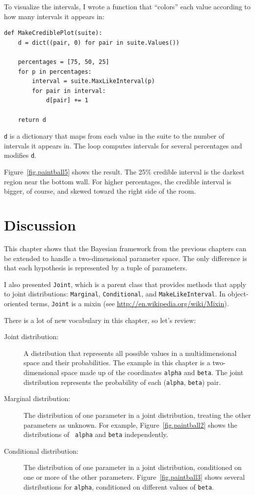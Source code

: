 \documentclass[12pt]{book}
\begin{document}
To visualize the intervals, I wrote a function that ``colors''
each value according to how many intervals it appears in:

\begin{verbatim}
def MakeCrediblePlot(suite):
    d = dict((pair, 0) for pair in suite.Values())

    percentages = [75, 50, 25]
    for p in percentages:
        interval = suite.MaxLikeInterval(p)
        for pair in interval:
            d[pair] += 1

    return d
\end{verbatim}

{\tt d} is a dictionary that maps from each value in the suite
to the number of intervals it appears in.  The loop computes intervals
for several percentages and modifies {\tt d}.

Figure~\ref{fig.paintball5} shows the result.  The 25\% credible
interval is the darkest region near the bottom wall.  For higher
percentages, the credible interval is bigger, of course, and skewed
toward the right side of the room.


\section{Discussion}

This chapter shows that the Bayesian framework from the previous
chapters can be extended to handle a two-dimensional parameter space.
The only difference is that each hypothesis is represented by
a tuple of parameters.

I also presented {\tt Joint}, which is a parent class that provides
methods that apply to joint distributions:
{\tt Marginal}, {\tt Conditional}, and {\tt MakeLikeInterval}.
In object-oriented terms,
{\tt Joint} is a mixin (see \url{http://en.wikipedia.org/wiki/Mixin}).

There is a lot of new vocabulary in this chapter, so let's review:

\begin{description}

\item[Joint distribution:] A distribution that represents all possible
  values in a multidimensional space and their probabilities.  The
  example in this chapter is a two-dimensional space made up of the
  coordinates {\tt alpha} and {\tt beta}.  The joint distribution
  represents the probability of each ({\tt alpha}, {\tt beta}) pair.

\item[Marginal distribution:] The distribution of one parameter in a
  joint distribution, treating the other parameters as unknown.  For
  example, Figure~\ref{fig.paintball2} shows the distributions of {\tt
    alpha} and {\tt beta} independently.

\item[Conditional distribution:] The distribution of one parameter in
  a joint distribution, conditioned on one or more of the other
  parameters.  Figure~\ref{fig.paintball3} shows several distributions for
  {\tt alpha}, conditioned on different values of {\tt beta}.

\end{description}
\end{document}
